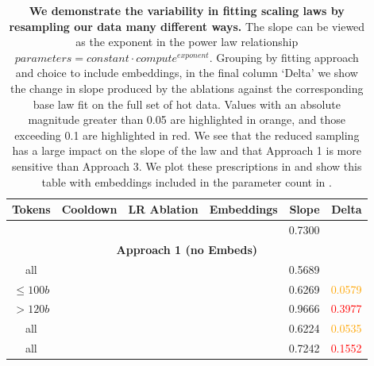 \documentclass{article}
\newcommand{\xmark}{\ding{55}} %
\newcommand{\cmark}{\ding{51}}
\begin{document}
\begin{table}[!ht]
\centering
\caption{
\textbf{We demonstrate the variability in fitting scaling laws by resampling our data many different ways.}
The slope can be viewed as the exponent in the power law relationship $parameters = constant\cdot  compute ^{ exponent}$. Grouping by fitting approach and choice to include embeddings, in the final column `Delta' we show the change in slope produced by the ablations against the corresponding base law fit on the full set of hot data. 
Values with an absolute magnitude greater than 0.05 are highlighted in orange, and those exceeding 0.1 are highlighted in red. We see that the reduced sampling has a large impact on the slope of the law and that Approach 1 is more sensitive than Approach 3.
We plot these prescriptions in  and show this table with embeddings included in the parameter count in . 
}
\label{app-tab:rainbow-table}
\vspace{2pt}
\begin{tabular}{ccccrr}
\toprule
Tokens & Cooldown & LR Ablation & Embeddings & Slope & Delta \\
\midrule
\citet{kaplan2020scaling} & & & & 0.7300  &  \\
\midrule\multicolumn{6}{c}{\textbf{Approach 1 (no Embeds)}} \\
all & \xmark & \xmark & \xmark & 0.5689 &  \\
$\le 100b$ & \xmark & \xmark & \xmark & 0.6269 & \textcolor{orange}{0.0579} \\
$>120b$ & \xmark & \xmark & \xmark & 0.9666 & \textcolor{red}{0.3977} \\
all & \xmark & \cmark & \xmark & 0.6224 & \textcolor{orange}{0.0535} \\
all & \cmark & \xmark & \xmark & 0.7242 & \textcolor{red}{0.1552} \\

\end{tabular}
\end{table}
\end{document}
